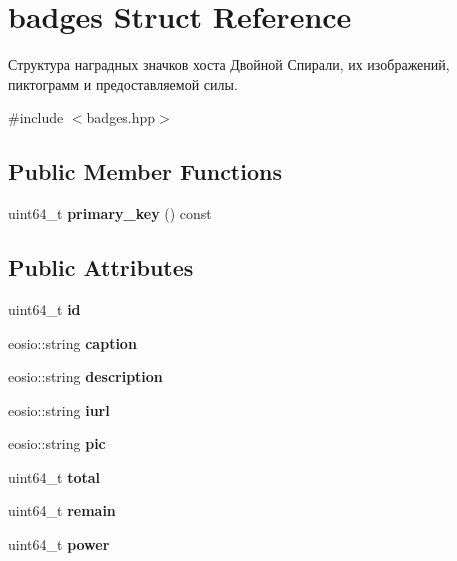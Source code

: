 \hypertarget{structbadges}{}\section{badges Struct Reference}
\label{structbadges}


Структура наградных значков хоста Двойной Спирали, их изображений, пиктограмм и предоставляемой силы.  




{\ttfamily \#include $<$badges.\+hpp$>$}

\subsection*{Public Member Functions}
\begin{DoxyCompactItemize}
\item 
\mbox{\label{structbadges_a39faf3dd577d5b5984a905ae56b74a4c}} 
uint64\+\_\+t {\bfseries primary\+\_\+key} () const
\end{DoxyCompactItemize}
\subsection*{Public Attributes}
\begin{DoxyCompactItemize}
\item 
\mbox{\label{structbadges_a6e9efcdda7d0682d696df63d4a87ff75}} 
uint64\+\_\+t {\bfseries id}
\item 
\mbox{\label{structbadges_adea9b101a049b24e47cc0f7cca5d2cfa}} 
eosio\+::string {\bfseries caption}
\item 
\mbox{\label{structbadges_a7d0b142c33dbe087f16b5929469b2cdf}} 
eosio\+::string {\bfseries description}
\item 
\mbox{\label{structbadges_aa69f1551abedad7b3c31ac69b8511f85}} 
eosio\+::string {\bfseries iurl}
\item 
\mbox{\label{structbadges_ab7d2eee512677af135bb8ebd494e714a}} 
eosio\+::string {\bfseries pic}
\item 
\mbox{\label{structbadges_a9af45ded7aa632b668f736f8a05ca706}} 
uint64\+\_\+t {\bfseries total}
\item 
\mbox{\label{structbadges_a7e4c05e6bb2a93929898b1d0d843b497}} 
uint64\+\_\+t {\bfseries remain}
\item 
\mbox{\label{structbadges_a669d9b961f82256c54236018eaf2e4cf}} 
uint64\+\_\+t {\bfseries power}
\end{DoxyCompactItemize}


